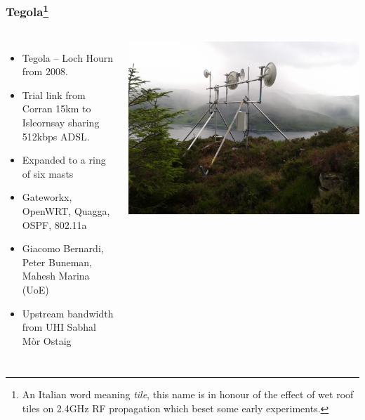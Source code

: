 \documentclass{beamer}
\begin{document}
\begin{frame}
  \frametitle{Tegola\footnote{An Italian word meaning \textit{tile},
      this name is in honour of the effect of wet roof tiles on 2.4GHz
      RF propagation which beset some early experiments.}}
  \begin{columns}
    \begin{itemize}
      \item Tegola -- Loch Hourn from 2008.
      \item Trial link from Corran 15km to Isleornsay sharing
        512kbps ADSL.
      \item Expanded to a ring of six masts
      \item Gateworkx, OpenWRT, Quagga, OSPF, 802.11a
      \item Giacomo Bernardi, Peter Buneman, Mahesh Marina (UoE)
      \item Upstream bandwidth from UHI Sabhal M\`{o}r Ostaig
    \end{itemize}
    \hspace{-2em}
    \includegraphics[width=1.1\textwidth]{mhialairigh-from-behind.jpg}
  \end{columns}
\end{frame}
\end{document}
